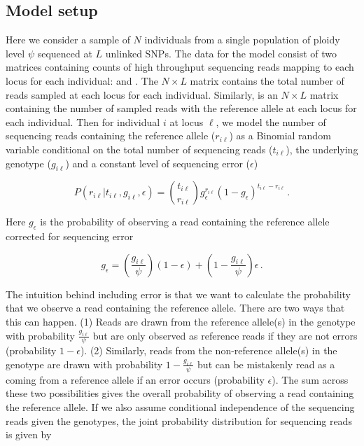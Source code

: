 \documentclass[11pt,english,letterpaper,oneside]{article}
\begin{document}
\medskip
\subsection{Model setup} %
\medskip

Here we consider a sample of $N$ individuals from a single population of ploidy level $\psi$ sequenced at $L$ unlinked SNPs. The data for the model consist of two matrices containing counts of high throughput sequencing reads mapping to each locus for each individual: \rmat{} and \tmat. The $N \times L$ matrix \tmat{} contains the total number of reads sampled at each locus for each individual. Similarly, \rmat{} is an $N \times L$ matrix containing the number of sampled reads with the reference allele at each locus for each individual. Then for individual $i$ at locus $\ell$, we model the number of sequencing reads containing the reference allele ($r_{i\ell}$) as a Binomial random variable conditional on the total number of sequencing reads ($t_{i\ell} $), the underlying genotype ($g_{i\ell}$) and a constant level of sequencing error ($\epsilon$)

\begin{equation}\label{likelihood}
P(r_{i \ell}|t_{i\ell}, g_{i \ell},\epsilon) = \binom{t_{i \ell}}{r_{i \ell}} g_\epsilon^{r_{i \ell}}(1-g_\epsilon)^{t_{i \ell}-r_{i \ell}}\,.
\end{equation}

\noindent Here $g_\epsilon$ is the probability of observing a read containing the reference allele corrected for sequencing error

\begin{equation}\label{g_error}
	g_\epsilon = \left(\frac{g_{i \ell}}{\psi}\right)(1-\epsilon) + \left(1-\frac{g_{i \ell}}{\psi}\right)\epsilon \,.
\end{equation}

\noindent The intuition behind including error is that we want to calculate the probability that we observe a read containing the reference allele. There are two ways that this can happen. (1) Reads are drawn from the reference allele(s) in the genotype with probability $\frac{g_{i\ell}}{\psi}$ but are only observed as reference reads if they are not errors (probability $1-\epsilon$). (2) Similarly, reads from the non-reference allele(s) in the genotype are drawn with probability $1-\frac{g_{i\ell}}{\psi}$ but can be mistakenly read as a coming from a reference allele if an error occurs (probability $\epsilon$). The sum across these two possibilities gives the overall probability of observing a read containing the reference allele. If we also assume conditional independence of the sequencing reads given the genotypes, the joint probability distribution for sequencing reads is given by
\end{document}
